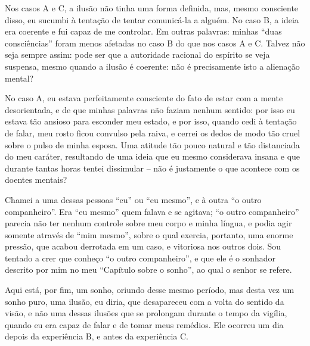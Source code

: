 Nos casos A e C, a ilusão não tinha uma forma definida, mas, mesmo
consciente disso, eu sucumbi à tentação de tentar comunicá-la a alguém.
 No caso B, a ideia era coerente e fui capaz de me controlar.  Em
outras palavras: minhas “duas consciências” foram menos afetadas no
caso B do que nos casos A e C.  Talvez não seja sempre assim: pode ser
que a autoridade racional do espírito se veja suspensa, mesmo quando a
ilusão é coerente: não é precisamente isto a alienação mental?

No caso A, eu estava perfeitamente consciente do fato de estar com a
mente desorientada, e de que minhas palavras não faziam nenhum sentido:
por isso eu estava tão ansioso para esconder meu estado, e por isso,
quando cedi à tentação de falar, meu rosto ficou convulso pela raiva, e
cerrei os dedos de modo tão cruel sobre o pulso de minha esposa.  Uma
atitude tão pouco natural e tão distanciada do meu caráter, resultando
de uma ideia que eu mesmo considerava insana e que durante tantas horas
tentei dissimular -- não é justamente o que acontece com os doentes
mentais?

Chamei a uma dessas pessoas “eu” ou “eu mesmo”, e à outra “o outro
companheiro”.  Era “eu mesmo” quem falava e se agitava; “o outro
companheiro” parecia não ter nenhum controle sobre meu corpo e minha
língua, e podia agir somente através de “mim mesmo”, sobre o qual
exercia, portanto, uma enorme pressão, que acabou derrotada em um caso,
e vitoriosa nos outros dois.  Sou tentado a crer que conheço “o outro
companheiro”, e que ele é o sonhador descrito por mim no meu “Capítulo
sobre o sonho”, ao qual o senhor se refere.

Aqui está, por fim, um sonho, oriundo desse mesmo período, mas desta vez
um sonho puro, uma ilusão, eu diria, que desapareceu com a volta do
sentido da visão, e não uma dessas ilusões que se prolongam durante o
tempo da vigília, quando eu era capaz de falar e de tomar meus
remédios.  Ele ocorreu um dia depois da experiência B, e antes da
experiência C.

